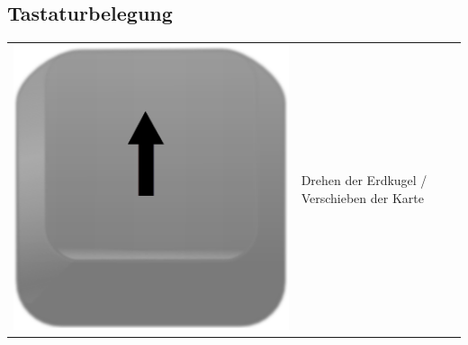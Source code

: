 \documentclass[10pt]{scrreprt}
\begin{document}
\subsection*{Tastaturbelegung}
\begin{tabular}{|>{\centering \arraybackslash}m{3cm}|m{10cm}|}
\hline
\rule[-1ex]{0pt}{7ex}\includegraphics[scale=0.08]{images/key_arrow_up.eps}& \multirow{3}{*}{Drehen der Erdkugel / Verschieben der Karte}\\

\end{tabular}
\end{document}
